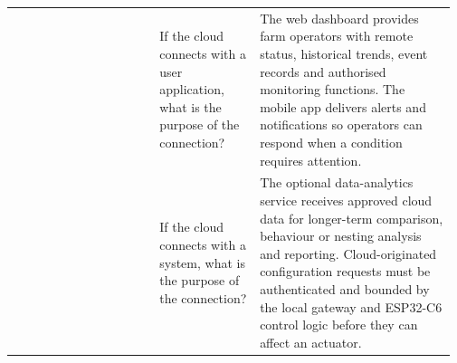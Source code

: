 \begin{longtable}{|P{0.15\linewidth}|P{0.17\linewidth}|P{0.22\linewidth}|P{0.43\linewidth}|}
 &  & If the cloud connects with a user application, what is the purpose of the connection? & The web dashboard provides farm operators with remote status, historical trends, event records and authorised monitoring functions. The mobile app delivers alerts and notifications so operators can respond when a condition requires attention.\\
 &  & If the cloud connects with a system, what is the purpose of the connection? & The optional data-analytics service receives approved cloud data for longer-term comparison, behaviour or nesting analysis and reporting. Cloud-originated configuration requests must be authenticated and bounded by the local gateway and ESP32-C6 control logic before they can affect an actuator.\\
\end{longtable}
